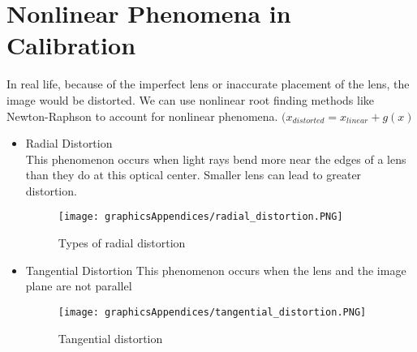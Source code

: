 \section{Nonlinear Phenomena in Calibration}
In real life, because of the imperfect lens or inaccurate placement of the lens, the image would be distorted. We can use nonlinear root finding methods like Newton-Raphson to account for nonlinear phenomena. $(x_{distorted} = x_{linear} + g(x)$ \\
\begin{itemize}
    \item Radial Distortion\\
    This phenomenon occurs when light rays bend more near the edges of a lens than they do at this optical center. Smaller lens can lead to greater distortion.
    \begin{figure}[H]
    \centering
    \texttt{[image: graphicsAppendices/radial\_distortion.PNG]}
    \caption{Types of radial distortion}
    \label{fig:radialDistortion}
\end{figure}

    \item Tangential Distortion
    This phenomenon occurs when the lens and the image plane are not parallel
    \begin{figure}[H]
    \centering
    \texttt{[image: graphicsAppendices/tangential\_distortion.PNG]}
    \caption{Tangential distortion}
    \label{fig:tangentialDistortion}
    \end{figure}
\end{itemize}